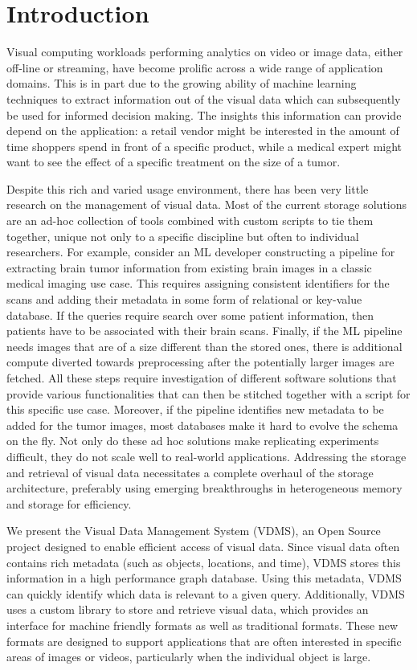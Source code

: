 \section{Introduction}
\label{intro}

Visual computing workloads performing analytics on
video or image data, either off-line or streaming,
have become prolific across a wide range of application domains.
This is in part due to the growing ability of machine learning techniques to
extract information out of the visual data which can subsequently be used
for informed decision making.
The insights this information can provide depend on the
application: a retail vendor might be interested in the amount of time
shoppers spend in front of a specific product, while a medical expert might
want to see the effect of a specific treatment on the size of a tumor.

Despite this rich and varied usage environment, there has been very little
research on the management of visual data.
Most of the current storage solutions are
an ad-hoc collection of tools combined with custom scripts to tie them
together, unique not only to a specific discipline but often to individual
researchers. For example, consider an ML developer constructing a pipeline
for extracting brain tumor information from existing brain images in a
classic medical imaging use case. This requires assigning consistent
identifiers for the scans and adding their metadata in
some form of relational or key-value database. If the queries require
search over some patient information, then patients have to be associated
with their brain scans. Finally, if the ML pipeline needs images that
are of a size different than the stored ones, there is additional compute
diverted towards preprocessing after the potentially larger images are
fetched. All these steps require investigation of different software
solutions that provide various functionalities that can then be stitched
together with a script for this specific use case.
Moreover, if the pipeline identifies
new metadata to be added for the tumor images, most databases make it
hard to evolve the schema on the fly.
Not only do these ad hoc solutions make replicating experiments
difficult, they do not scale well to real-world applications.
Addressing the storage and retrieval of visual data necessitates a complete
overhaul of the storage architecture,
preferably using emerging breakthroughs in
heterogeneous memory and storage for efficiency.

We present the Visual Data Management System (VDMS)\cite{darkside},
an Open Source project designed to enable efficient access of visual data.
Since visual data often contains
rich metadata (such as objects, locations, and time), VDMS stores this
information in a high performance graph database. Using this metadata, VDMS
can quickly identify which data is relevant to a given query.
Additionally, VDMS uses a custom library to store and retrieve visual data,
which provides an interface for machine friendly formats as well as
traditional formats. These new formats are designed to support applications
that are often interested in specific areas of images or videos,
particularly when the individual object is large.

